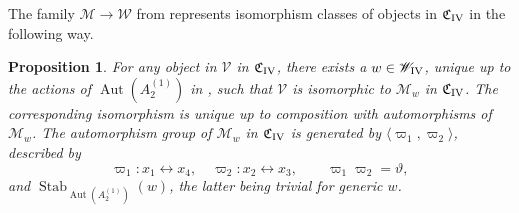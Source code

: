 \documentclass[a4paper,reqno]{amsart}
\numberwithin{equation}{section}
\DeclareMathOperator{\Aut}{Aut}
\newtheorem{proposition}[theorem]{Proposition}
\numberwithin{equation}{section}
\begin{document}
The family $\mathcal{M}\to \mathscr{W}$ from  represents isomorphism classes of objects in $\mathfrak{C}_{\rm IV}$ in the following way.
\begin{proposition} \label{prop:oblomkovstylenormalformPIV}
    For any object in $\mathcal{V}$ in $\mathfrak{C}_{\rm IV}$, there exists a $w\in \mathscr{W}_{\rm{IV}}$, unique up to the actions of $\operatorname{Aut}(A_2^{(1)})$ in ,
  such that $\mathcal{V}$ is isomorphic to $\mathcal{M}_w$ in $\mathfrak{C}_{\rm IV}$.  The corresponding isomorphism is unique up to composition with automorphisms of $\mathcal{M}_w$.
  The automorphism group of $\mathcal{M}_w$ in $\mathfrak{C}_{\rm{IV}}$ is generated by $\langle\varpi_1,\varpi_2\rangle$, described by
      \begin{equation} \label{eq:PIVxsymmetriesvarpi}
    \varpi_{1} : x_1\leftrightarrow x_4,\quad \varpi_2 : x_2 \leftrightarrow x_3, \qquad \varpi_1\varpi_2 = \vartheta,
\end{equation}
  and $\operatorname{Stab}_{\Aut(A_2^{(1)})}\left(w\right)$, the latter being trivial for generic $w$.  


\end{proposition}
\end{document}
